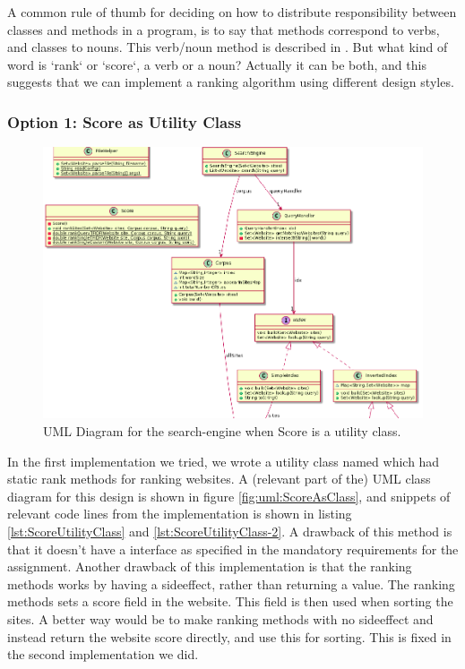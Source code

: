 A common rule of thumb for deciding on how to distribute responsibility between classes and methods in a program, is to say that methods correspond to verbs, and classes to nouns. This verb/noun method is described in \cite[p.530]{BK}.
But what kind of word is `rank` or `score`, a verb or a noun? Actually it can be both, and this suggests that we can implement a ranking algorithm using different design styles.

\subsubsection{Option 1: Score as Utility Class}
\begin{figure}[t]
	\centering
	\includegraphics[width=\textwidth]{graphics/uml/ScoreAsUtilityZoom.png}
	\caption{UML Diagram for the search-engine when Score is a utility class.}
	\label{fig:uml:ScoreAsUtility}
\end{figure}

In the first implementation we tried, we wrote a utility class named  which had static rank methods for ranking websites.   
A (relevant part of the) UML class diagram for this design is shown in figure \ref{fig:uml:ScoreAsClass}, and snippets of relevant code lines from the implementation is shown in listing \ref{lst:ScoreUtilityClass} and \ref{lst:ScoreUtilityClass-2}. 
A drawback of this method is that it doesn't have a  interface as specified in the mandatory requirements for the assignment.
Another drawback of this implementation is that the ranking methods works by having a sideeffect, rather than returning a value. The ranking methods sets a score field in the website. This field is then used when sorting the sites. A better way would be to make ranking methods with no sideeffect and instead return the website score directly, and use this for sorting. This is fixed in the second implementation we did.      

